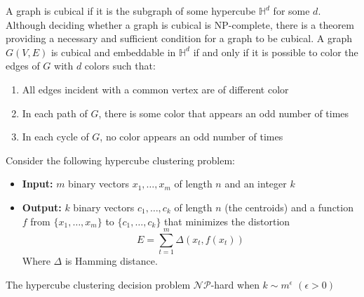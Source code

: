 A graph is cubical if it is the subgraph of some hypercube $\mathbb{H}^d$ for some $d$. Although deciding whether a graph is cubical is NP-complete, there is a theorem providing a necessary and sufficient condition for a graph to be cubical. A graph $G(V,E)$ is cubical and embeddable in $\mathbb{H}^d$ if and only if it is possible to color the edges of $G$ with $d$ colors such that:
\begin{enumerate}
    \item All edges incident with a common vertex are of different color
    \item In each path of $G$, there is some color that appears an odd number of times
    \item In each cycle of $G$, no color appears an odd number of times
\end{enumerate} 
\begin{theorem}
    Consider the following hypercube clustering problem:
    \begin{itemize}
        \item \textbf{Input:} $m$ binary vectors $x_1, \dots, x_m$ of length $n$ and an integer $k$
        \item \textbf{Output:} $k$ binary vectors $c_1, \dots, c_k$ of length $n$ (the centroids) and a function $f$ from $\{x_1, \dots, x_m\}$ to $\{c_1, \dots, c_k\}$ that minimizes the distortion 
        \[
            E = \sum_{t=1}^m \Delta(x_t, f(x_t))    
        \]
        Where $\Delta$ is Hamming distance.
    \end{itemize}
    The hypercube clustering decision problem $\mathcal{NP}$-hard when $k \sim m^\epsilon$ $(\epsilon > 0)$
\end{theorem}

